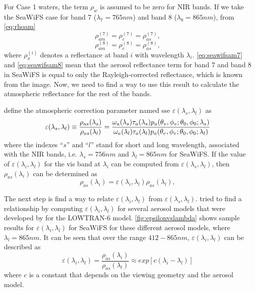 For Case 1 waters, the term $\rho_{w}$ is assumed to be zero for NIR bands. If we take the SeaWiFS case for band 7 ($\lambda_7=765nm$) and band 8 ($\lambda_8=865nm$), from \autoref{eq:rhoam}
\begin{equation}\label{eq:seawifsam7}
    \rho_{am}^{(7)} = \rho_{c}^{(7)} = \rho_{as}^{(7)},
\end{equation}
\begin{equation}\label{eq:seawifsam8}
    \rho_{am}^{(8)} = \rho_{c}^{(8)} = \rho_{as}^{(8)},
\end{equation}
where $\rho_{x}^{(i)}$ denotes a reflectance at band $i$ with wavelength $\lambda_i$. \autoref{eq:seawifsam7} and \autoref{eq:seawifsam8} mean that the aerosol reflectance term for band 7 and band 8 in SeaWiFS is equal to only the Rayleigh-corrected reflectance, which is known from the image. Now, we need to find a way to use this result to calculate the atmospheric reflectance for the rest of the bands.

\cite{Gordon:1994} define the atmospheric correction parameter named \gls{sse} $\varepsilon(\lambda_s,\lambda_l)$ \cite{IOCCG:2010} as
\begin{equation}\label{eq:espilon}
  \varepsilon(\lambda_s,\lambda_l) \equiv \frac{\rho_{as}(\lambda_s)}{\rho_{as}(\lambda_l)} = \\
  \frac{\omega_a(\lambda_s)\tau_a(\lambda_s)p_a(\theta_v,\phi_v;\theta_0,\phi_0;\lambda_s)}{\omega_a(\lambda_l)\tau_a(\lambda_l)p_a(\theta_v,\phi_v;\theta_0,\phi_0;\lambda_l)}
\end{equation}
where the indexes ``$s$'' and ``$l$'' stand for short and long wavelength, associated with the NIR bands, i.e. $\lambda_s=756nm$ and $\lambda_l=865nm$ for SeaWiFS. If the value of $\varepsilon(\lambda_i,\lambda_l)$ for the \gls{vis} band at $\lambda_i$ can be computed from $\varepsilon(\lambda_s,\lambda_l)$, then $\rho_{as}(\lambda_i)$ can be determined as
\begin{equation}\label{eq:rholambda_i}
  \rho_{as}(\lambda_i) = \varepsilon(\lambda_i,\lambda_l)\rho_{as}(\lambda_l),
\end{equation}

The next step is find a way to relate $\varepsilon(\lambda_i,\lambda_l)$ from $\varepsilon(\lambda_s,\lambda_l)$. \cite{Gordon:1994} tried to find a relationship by computing  $\varepsilon(\lambda_i,\lambda_l)$ for several aerosol models that were developed by \cite{Shettle:1979} for the LOWTRAN-6 model. \autoref{fig:epsilonvslambda} shows sample results for $\varepsilon(\lambda_i,\lambda_l)$ for SeaWiFS for these different aerosol models, where $\lambda_l=865nm$. It can be seen that over the range $412-865nm$, $\varepsilon(\lambda_i,\lambda_l)$ can be described as
\begin{equation}\label{eq:epsilonexp}
  \varepsilon(\lambda_i,\lambda_l) = \frac{\rho_{as}(\lambda_i)}{\rho_{as}(\lambda_l)} \approx exp[c(\lambda_i-\lambda_l)]
\end{equation}
where $c$ is a constant that depends on the viewing geometry and the aerosol model. 

